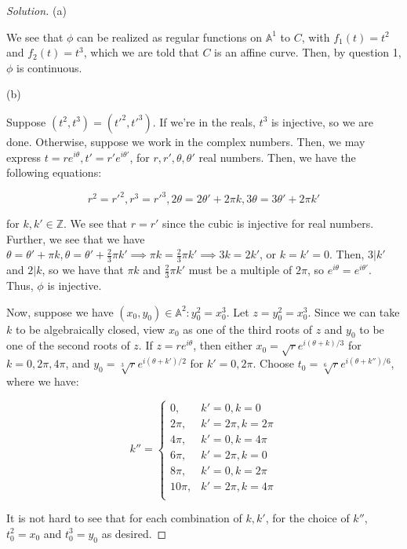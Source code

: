 \documentclass[10pt]{article}
\begin{document}
\begin{proof}[Solution]

(a) 

We see that $\phi$ can be realized as regular functions on $\mathbb{A}^1$ to $C$, with $f_1(t) = t^2$ and $f_2(t) = t^3$, which we are told that $C$  is an affine curve. Then, by question 1, $\phi$ is continuous.

(b)


Suppose $(t^2,t^3) = (t'^2,t'^3)$. If we're in the reals, $t^3$ is injective, so we are done. Otherwise, suppose we work in the complex numbers. Then, we may express $t = r e^{i\theta}, t' = r'e^{i \theta'}$, for $r,r',\theta,\theta'$ real numbers. Then, we have the following equations:

$$r^2 = r'^2, r^3 = r'^3, 2\theta = 2\theta' + 2\pi k, 3\theta = 3\theta' + 2\pi k'$$

for $k,k' \in \mathbb{Z}$. We see that $r = r'$ since the cubic is injective for real numbers. Further, we see that we have $\theta = \theta' + \pi k, \theta = \theta' + \frac{2}{3} \pi k' \implies \pi k = \frac{2}{3} \pi k' \implies 3k = 2k'$, or $k = k' = 0$. Then, $3 | k'$ and $2 | k$, so we have that $\pi k$  and $\frac{2}{3}\pi k'$ must be a multiple of $2\pi$, so $e^{i \theta} = e^{i \theta'}$. Thus, $\phi$ is injective.

Now, suppose we have $(x_0,y_0) \in \mathbb{A}^2 : y_0^2 = x_0^3$. Let $z = y_0^2 = x_0^3$. Since we can take $k$ to be algebraically closed, view $x_0$ as one of the third roots of $z$ and $y_0$ to be one of the second roots of $z$. If $z = r e^{i\theta}$, then either $x_0 = \sqrt{r} e^{i (\theta + k)/3}$ for $k= 0,2\pi, 4\pi$, and $y_0 = \sqrt[3]{r} e^{i (\theta + k') /2}$ for $k' = 0, 2\pi$. Choose $t_0 = \sqrt[6]{r} e^{i (\theta + k'')/6}$, where we have:

$$k'' = \begin{cases} 0, & k' = 0, k  = 0\\
2\pi, & k' = 2\pi, k = 2\pi \\
4\pi, & k' = 0, k = 4\pi \\ 
6\pi, & k' = 2\pi, k = 0 \\
8\pi, & k' = 0, k = 2\pi \\
10\pi, & k' = 2\pi, k = 4\pi \\ \end{cases} $$

It is not hard to see that for each combination of $k,k'$, for the choice of $k''$, $t_0^2 = x_0$ and $t_0^3 = y_0$ as desired.


\end{proof}
\end{document}
